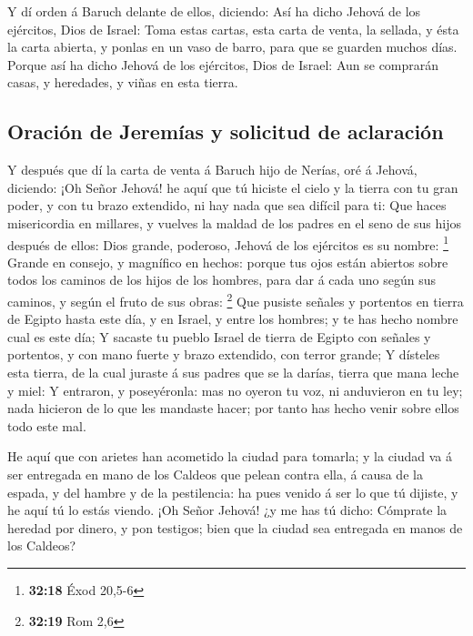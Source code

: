  Y dí orden á Baruch delante de ellos, diciendo:
 Así ha dicho Jehová de los ejércitos, Dios de Israel: Toma
estas cartas, esta carta de venta, la sellada, y ésta la carta abierta,
y ponlas en un vaso de barro, para que se guarden muchos días.
 Porque así ha dicho Jehová de los ejércitos, Dios de
Israel: Aun se comprarán casas, y heredades, y viñas en esta tierra.

\hypertarget{oraciuxf3n-de-jeremuxedas-y-solicitud-de-aclaraciuxf3n}{%
\subsection{Oración de Jeremías y solicitud de
aclaración}\label{oraciuxf3n-de-jeremuxedas-y-solicitud-de-aclaraciuxf3n}}

 Y después que dí la carta de venta á Baruch hijo de
Nerías, oré á Jehová, diciendo:  ¡Oh Señor Jehová! he aquí
que tú hiciste el cielo y la tierra con tu gran poder, y con tu brazo
extendido, ni hay nada que sea difícil para ti:  Que haces
misericordia en millares, y vuelves la maldad de los padres en el seno
de sus hijos después de ellos: Dios grande, poderoso, Jehová de los
ejércitos es su nombre: \footnote{\textbf{32:18} Éxod 20,5-6}
 Grande en consejo, y magnífico en hechos: porque tus ojos
están abiertos sobre todos los caminos de los hijos de los hombres, para
dar á cada uno según sus caminos, y según el fruto de sus obras:
\footnote{\textbf{32:19} Rom 2,6}  Que pusiste señales y
portentos en tierra de Egipto hasta este día, y en Israel, y entre los
hombres; y te has hecho nombre cual es este día;  Y sacaste
tu pueblo Israel de tierra de Egipto con señales y portentos, y con mano
fuerte y brazo extendido, con terror grande;  Y dísteles
esta tierra, de la cual juraste á sus padres que se la darías, tierra
que mana leche y miel:  Y entraron, y poseyéronla: mas no
oyeron tu voz, ni anduvieron en tu ley; nada hicieron de lo que les
mandaste hacer; por tanto has hecho venir sobre ellos todo este mal.

 He aquí que con arietes han acometido la ciudad para
tomarla; y la ciudad va á ser entregada en mano de los Caldeos que
pelean contra ella, á causa de la espada, y del hambre y de la
pestilencia: ha pues venido á ser lo que tú dijiste, y he aquí tú lo
estás viendo.  ¡Oh Señor Jehová! ¿y me has tú dicho:
Cómprate la heredad por dinero, y pon testigos; bien que la ciudad sea
entregada en manos de los Caldeos?

